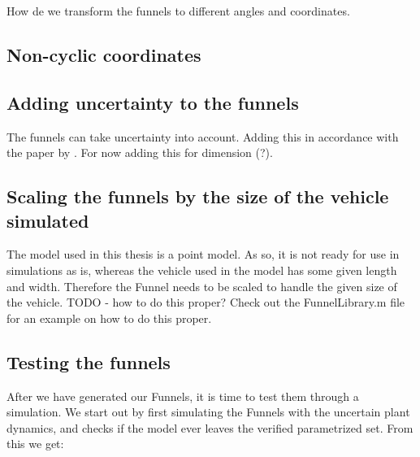 How de we transform the funnels to different angles and coordinates.

\subsection{Non-cyclic coordinates}

\subsection{Adding uncertainty to the funnels}

The funnels can take uncertainty into account. Adding this in accordance with
the paper by \cite{majumedar2013}. For now adding this for dimension (?).

\subsection{Scaling the funnels by the size of the vehicle simulated}

The model used in this thesis is a point model. As so, it is not ready for use
in simulations as is, whereas the vehicle used in the model has some given
length and width. Therefore the Funnel needs to be scaled to handle the given
size of the vehicle. TODO - how to do this proper? Check out the FunnelLibrary.m
file for an example on how to do this proper.

\subsection{Testing the funnels}

After we have generated our Funnels, it is time to test them through a
simulation. We start out by first simulating the Funnels with the uncertain
plant dynamics, and checks if the model ever leaves the verified parametrized
set. From this we get:

